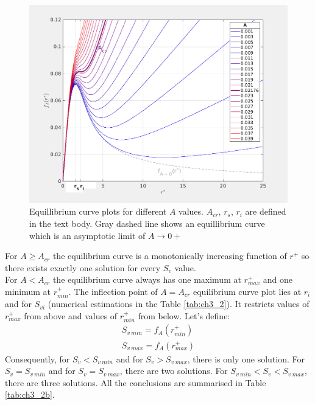 \documentclass[../main.tex]{subfiles}
\begin{document}
\begin{figure}
\centering
\noindent \includegraphics[width=30pc]{gfx/eq_curves.png}
\caption{Equillibrium curve plots for different $A$ values. $A_{cr}$, $r_s$, $r_i$ are defined in the text body. Gray dashed line shows an equillibrium curve which is an asymptotic limit of $A \rightarrow 0+$}
\label{fig:ch3_6}
\end{figure}

For $A \geq A_{cr}$ the equilibrium curve is a monotonically increasing function of $r^+$ so there exists exactly one solution for every $S_v$ value.\\
For $A<A_{cr}$ the equilibrium curve always has one maximum at $r^+_{max}$ and one minimum at $r^+_{min}$. The inflection point of $A=A _{cr}$ equilibrium curve plot lies at $r_i$ and for $S_{v i}$ (numerical estimations in the Table \ref{tab:ch3_2}). It restricts values of $r^+_{max}$ from above and values of $r^+_{min}$ from below. Let's define:
\begin{align}
S_{v\ min}=f_A(r^+_{min}) \\
S_{v\ max}=f_A(r^+_{max})
\label{ch3:eq28b}
\end{align}
Consequently, for $S_v<S_{v\ min}$ and for $S_v>S_{v\ max}$, there is only one solution. For $S_v=S_{v\ min}$ and for $S_v=S_{v\ max}$, there are two solutions. For $S_{v\ min}<S_v<S_{v\ max}$, there are three solutions. All the conclusions are summarised in Table \ref{tab:ch3_2b}.
\end{document}
